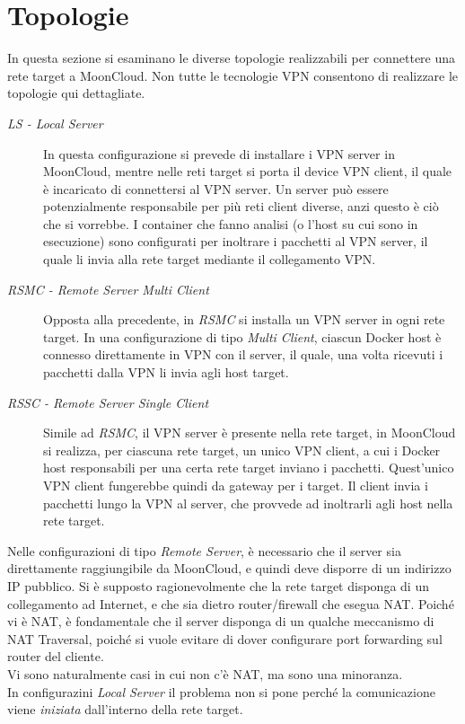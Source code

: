 \section{Topologie}
In questa sezione si esaminano le diverse topologie realizzabili per connettere una rete
target a MoonCloud. Non tutte le tecnologie VPN consentono di realizzare le topologie qui
dettagliate.
\begin{description}
	\item[\textit{LS - Local Server}]In questa configurazione si prevede di installare i
	VPN server in MoonCloud, mentre nelle reti target si porta il device
	VPN client, il quale è incaricato di connettersi al VPN server. Un server può essere
	potenzialmente responsabile per più reti client diverse, anzi questo
	è ciò che si vorrebbe. I container che fanno analisi
	(o l'host su cui sono in esecuzione)
	sono configurati per inoltrare i pacchetti al VPN server, il quale li invia alla rete
	target mediante il collegamento VPN.
	\item[\textit{RSMC - Remote Server Multi Client}]Opposta alla precedente, in \textit{RSMC}
	si installa un VPN server in ogni rete target. In una configurazione di tipo
	\textit{Multi Client}, ciascun Docker host è connesso direttamente in VPN con il server, il
	quale, una volta ricevuti i pacchetti dalla VPN li invia agli host target.
	\item[\textit{RSSC - Remote Server Single Client}]Simile ad \textit{RSMC}, il VPN
	server è presente nella rete target, in MoonCloud si realizza, per ciascuna rete
	target, un unico VPN client, a cui i Docker host responsabili per una certa rete target inviano
	i pacchetti. Quest'unico VPN client fungerebbe quindi da gateway per i target.
	Il client invia i pacchetti lungo la VPN al server,
	che provvede ad inoltrarli agli host nella rete target.
\end{description}
Nelle configurazioni di tipo \textit{Remote Server}, è necessario che il server sia
direttamente raggiungibile da MoonCloud, e quindi deve disporre di un indirizzo IP pubblico.
Si è supposto ragionevolmente che la rete target disponga di un collegamento ad Internet, e che
sia dietro router/firewall che esegua NAT. Poiché vi è NAT, è fondamentale che il server disponga
di un qualche meccanismo di NAT Traversal, poiché si vuole evitare di dover configurare
port forwarding sul router del cliente.\\
Vi sono naturalmente casi in cui non c'è NAT, ma sono una minoranza.\\
In configurazini \textit{Local Server} il problema non si pone perché la comunicazione viene
\textit{iniziata} dall'interno della rete target.

